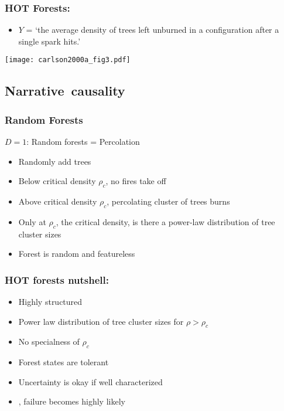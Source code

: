\begin{frame}
  \frametitle{HOT Forests:}

  \begin{block}{}
    \begin{itemize}
    \item 
      $Y$ =  `the average density of trees left unburned in a configuration after a single spark hits.'\cite{carlson2000a}
    \end{itemize}
      \texttt{[image: carlson2000a\_fig3.pdf]}
  \end{block}

\end{frame}

\subsection{Narrative\ causality}


\begin{frame}
  \frametitle{Random Forests}

  \begin{block}{$D=1$: Random forests = Percolation\cite{stauffer1992a}}
    \begin{itemize}
    \item<1-> Randomly add trees
    \item<2-> Below critical density $\rho_c$, no fires take off
    \item<3-> Above critical density $\rho_c$, percolating
      cluster of trees burns
    \item<4-> Only at $\rho_c$, the critical density,
      is there a power-law distribution of tree cluster sizes
    \item<5-> Forest is random and featureless
    \end{itemize}
  \end{block}

\end{frame}



\begin{frame}
  \frametitle{HOT forests nutshell:}

  \begin{block}{}
    \begin{itemize}
    \item<1-> Highly structured
    \item<2-> Power law distribution of tree cluster sizes 
      for $\rho > \rho_c$
    \item<3-> No specialness of $\rho_c$ 
    \item<4-> Forest states are \alert{tolerant}
    \item<5-> Uncertainty is okay if well characterized
    \item<6-> , failure
      becomes \alert{highly likely}
    \end{itemize}
  \end{block}

\end{frame}


